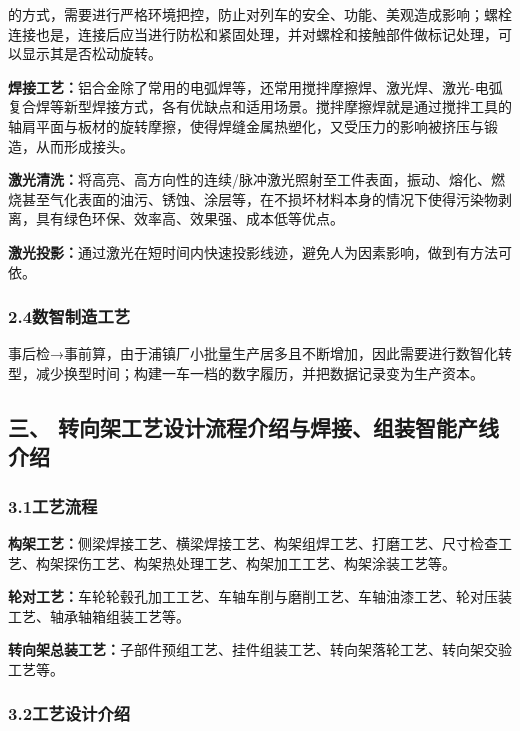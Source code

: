 \documentclass[12pt, oneside, a4paper]{ctexart}
\begin{document}
\newpage
\journalpage\par\noindent
的方式，需要进行严格环境把控，防止对列车的安全、功能、美观造成影响；螺栓连接也是，连接后应当进行防松和紧固处理，并对螺栓和接触部件做标记处理，可以显示其是否松动旋转。\par{}
{\bf{}焊接工艺：}铝合金除了常用的电弧焊等，还常用搅拌摩擦焊、激光焊、激光-电弧复合焊等新型焊接方式，各有优缺点和适用场景。搅拌摩擦焊就是通过搅拌工具的轴肩平面与板材的旋转摩擦，使得焊缝金属热塑化，又受压力的影响被挤压与锻造，从而形成接头。\par{}
{\bf{}激光清洗：}将高亮、高方向性的连续/脉冲激光照射至工件表面，振动、熔化、燃烧甚至气化表面的油污、锈蚀、涂层等，在不损坏材料本身的情况下使得污染物剥离，具有绿色环保、效率高、效果强、成本低等优点。\par{}
{\bf{}激光投影：}通过激光在短时间内快速投影线迹，避免人为因素影响，做到有方法可依。\par{}
\vspace{-5mm}\subsubsection*{2.4\quad{}数智制造工艺}\vspace{-2mm}
事后检→事前算，由于浦镇厂小批量生产居多且不断增加，因此需要进行数智化转型，减少换型时间；构建一车一档的数字履历，并把数据记录变为生产资本。\par{}
\vspace{-5mm}\subsection*{三、 转向架工艺设计流程介绍与焊接、组装智能产线介绍}
\vspace{-2mm}\subsubsection*{3.1\quad{}工艺流程}\vspace{-2mm}
{\bf{}构架工艺：}侧梁焊接工艺、横梁焊接工艺、构架组焊工艺、打磨工艺、尺寸检查工艺、构架探伤工艺、构架热处理工艺、构架加工工艺、构架涂装工艺等。\par{}
{\bf{}轮对工艺：}车轮轮毂孔加工工艺、车轴车削与磨削工艺、车轴油漆工艺、轮对压装工艺、轴承轴箱组装工艺等。\par{}
{\bf{}转向架总装工艺：}子部件预组工艺、挂件组装工艺、转向架落轮工艺、转向架交验工艺等。
\vspace{-5mm}\subsubsection*{3.2\quad{}工艺设计介绍}\vspace{-2mm}
\end{document}
